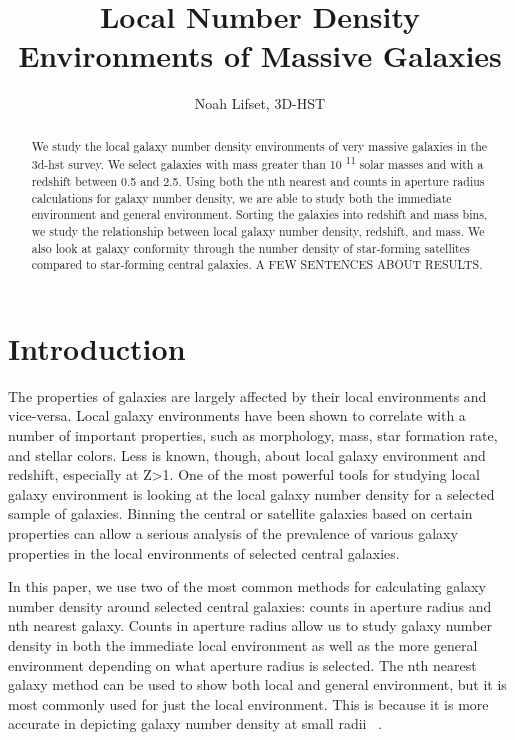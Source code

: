 \documentclass[apj]{emulateapj}
\begin{document}
 
\title{Local Number Density Environments of Massive Galaxies}

\author{Noah Lifset, 3D-HST}

\begin{abstract}

We study the local galaxy number density environments of very massive galaxies in the 3d-hst survey. We select galaxies with mass greater than 10 \textsuperscript{11} solar masses and with a redshift between 0.5 and 2.5. Using both the nth nearest and counts in aperture radius calculations for galaxy number density, we are able to study both the immediate environment and general environment. Sorting the galaxies into  redshift and mass bins, we study the relationship between local galaxy number density, redshift, and mass. We also look at galaxy conformity through the number density of star-forming satellites compared to star-forming central galaxies. A FEW SENTENCES ABOUT RESULTS.
\end{abstract}
\keywords{}

\section{Introduction}

The properties of galaxies are largely affected by their local environments and vice-versa. Local galaxy environments have been shown to correlate with a number of important properties, such as morphology, mass, star formation rate, and stellar colors. Less is known, though, about local galaxy environment and redshift, especially at Z\textgreater1. One of the most powerful tools for studying local galaxy environment is looking at the local galaxy number density for a selected sample of galaxies. Binning the central or satellite galaxies based on certain properties can allow a serious analysis of the prevalence of various galaxy properties in the local environments of selected central galaxies. 

In this paper, we use two of the most common methods for calculating galaxy number density around selected central galaxies: counts in aperture radius and nth nearest galaxy. Counts in aperture radius allow us to study galaxy number density in both the immediate local environment as well as the more general environment depending on what aperture radius is selected. The nth nearest galaxy method can be used to show both local and general environment, but it is most commonly used for just the local environment. This is because it is more accurate in depicting galaxy number density at small radii ~\cite{2005ApJ...634..833C}. 
\end{document}

